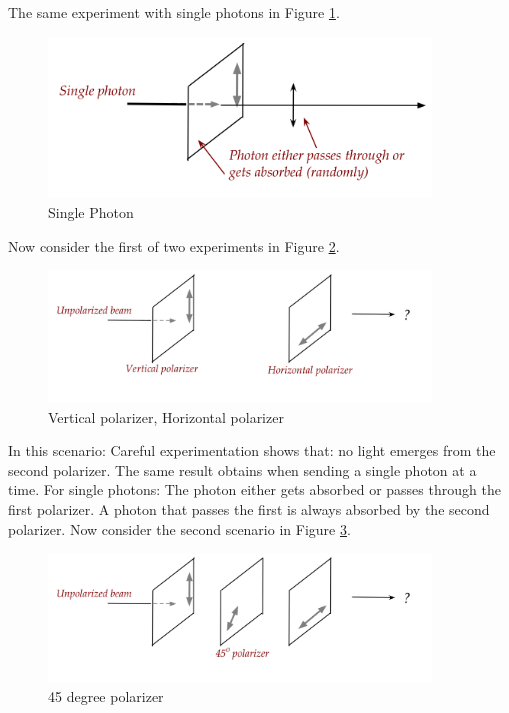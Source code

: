 \documentclass[main.tex]{subfiles}
\begin{document}
    The same experiment with single photons in Figure \ref{fig:24polarizer1b}.
    
    \begin{figure}
        \centering
        \includegraphics[width=4in]{notes/figs/n05/24polarizer1b.png}
        \caption{Single Photon}
        \label{fig:24polarizer1b}
    \end{figure}
    
    Now consider the first of two experiments in Figure \ref{fig:25polarizer2}.
    
    \begin{figure}
        \centering
        \includegraphics[width=4in]{notes/figs/n05/25polarizer2.png}
        \caption{Vertical polarizer, Horizontal polarizer}
        \label{fig:25polarizer2}
    \end{figure} 
    
    In this scenario: Careful experimentation shows that: no light emerges from the second polarizer. The same result obtains when sending a single photon at a time. For single photons: The photon either gets absorbed or passes through the first polarizer. A photon that passes the first is always absorbed by the second polarizer. Now consider the second scenario in Figure \ref{fig:26polarizer3}.
    
    \begin{figure}
        \centering
        \includegraphics[width=4in]{notes/figs/n05/26polarizer3.png}
        \caption{45 degree polarizer}
        \label{fig:26polarizer3}
    \end{figure} 
    
\end{document}
